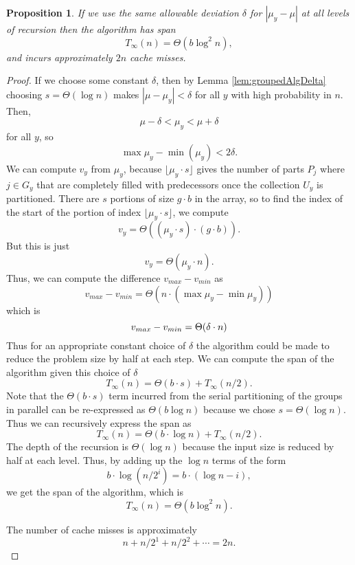 \documentclass[twocolumn, twoside, 12pt]{article}
\DeclarePairedDelimiter{\paren}{(}{)}
\newtheorem{proposition}{Proposition}
\begin{document}
\begin{proposition}
If we use the same allowable deviation $\delta$ for $|\mu_y - \mu|$ at all levels of recursion then the algorithm has span $$T_{\infty}(n) = \Theta(b\log^2 n),$$ and incurs approximately $2n$ cache misses.
\end{proposition}

\begin{proof}
If we choose some constant $\delta$, then by Lemma \ref{lem:groupedAlgDelta} choosing $s = \Theta(\log n)$ makes ${|\mu - \mu_y| < \delta}$ for all $y$ with high probability in $n$. 
Then,
$$\mu - \delta < \mu_y < \mu + \delta$$
for all $y$, so 
	$$\max{\mu_y} - \min(\mu_y) < 2\delta. $$
We can compute $v_y$ from $\mu_y$, because $\lfloor \mu_y\cdot s \rfloor$ gives the number of parts $P_j$ where $j \in G_y$ that are completely filled with predecessors once the collection $U_y$ is partitioned. 
There are $s$ portions of size $g\cdot b$ in the array, so to find the index of the start of the portion of index $\lfloor \mu_y\cdot s \rfloor$, we compute
	$$v_y = \Theta((\mu_y \cdot s)\cdot (g\cdot b)).$$
	But this is just 
	$$v_y = \Theta(\mu_y \cdot n).$$
	Thus, we can compute the difference ${v_{max} - v_{min}}$ as 
	$$v_{max} - v_{min} = \Theta(n \cdot (\max{\mu_y} - \min{\mu_y}))$$
which is
	$$v_{max} - v_{min} = \Theta\paren*{\delta\cdot n}$$
	Thus for an appropriate constant choice of $\delta$ the algorithm could be made to reduce the problem size by half at each step. We can compute the span of the algorithm given this choice of $\delta$
$$T_{\infty}(n) = \Theta(b\cdot s)+T_{\infty}(n/2).$$
	Note that the $\Theta(b\cdot s)$ term incurred from the serial partitioning of the groups in parallel can be re-expressed as $\Theta(b \log n)$ because we chose $s=\Theta(\log n)$.
Thus we can recursively express the span as 
$$T_{\infty}(n) = \Theta(b\cdot \log n)+T_{\infty}(n/2).$$
	The depth of the recursion is $\Theta(\log n)$ because the input size is reduced by half at each level. Thus, by adding up the $\log n$ terms of the form $$b \cdot \log (n/2^i) = b\cdot (\log n - i), $$
we get the span of the algorithm, which is 
	$$T_{\infty}(n) = \Theta(b\log^2 n).$$

	The number of cache misses is approximately
	$$n + n/2^1 + n/2^2 + \cdots = 2n .$$
\end{proof}
\end{document}
